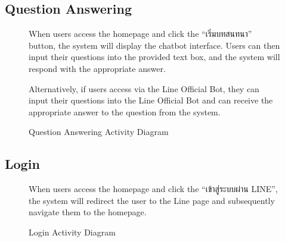 \documentclass[12pt,oneside,openright,a4paper]{cpe-english-project}
\begin{document}
      \subsection{Question Answering}
      \begin{figure}[H]
        \centering
        \caption{Question Answering Activity Diagram}\label{fig:AD_FAQ}
        \begin{justify}
          \qquad When users access the homepage and click the “\textthai{เริ่มบทสนทนา}” button, the system will display the chatbot interface. Users can then input their questions into the provided text box, and the system will respond with the appropriate answer. \par
          \qquad Alternatively, if users access via the Line Official Bot, they can input their questions into the Line Official Bot and can receive the appropriate answer to the question from the system. \par
        \end{justify}
      \end{figure}

      \subsection{Login}
      \begin{figure}[H]
        \centering
        \caption{Login Activity Diagram}\label{fig:AD_Login}
        \begin{justify}
          \qquad When users access the homepage and click the “\textthai{เข้าสู่ระบบผ่าน} LINE”, the system will redirect the user to the Line page and subsequently navigate them to the homepage. \par
        \end{justify}
      \end{figure}
\newpage
\end{document}
